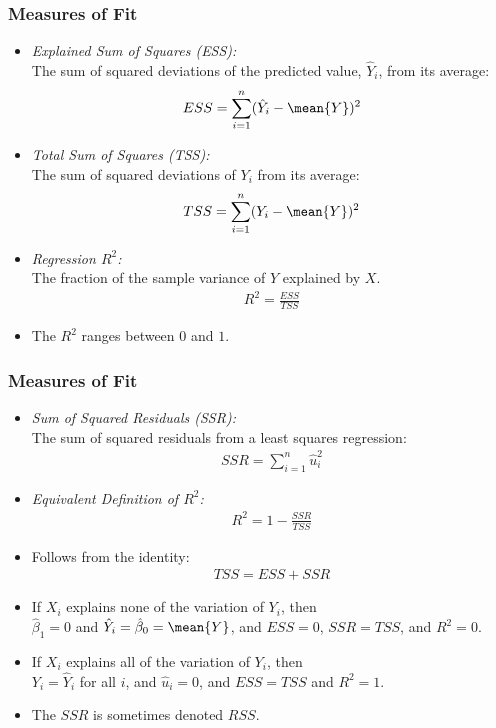 

\begin{frame}
\frametitle{Measures of Fit}
\begin{itemize}
\item \emph{Explained Sum of Squares (ESS):}\\
The sum of squared deviations of the predicted value, $\hat{Y}_i$, from its average: 
\begin{align*}
ESS = \sum_{i=1}^{n}(\hat{Y}_i-\mean{Y})^2
\end{align*}
\item \emph{Total Sum of Squares (TSS):}\\
The sum of squared deviations of $Y_i$ from its average:
\begin{align*}
TSS = \sum_{i=1}^{n}(Y_i-\mean{Y})^2
\end{align*}
\item \emph{Regression $R^{2}$:}\\ 
The fraction of the sample variance of $Y$ explained by $X$. 
\begin{align*}
R^{2} = \frac{ESS}{TSS}
\end{align*}
\item The $R^2$ ranges between $0$ and $1$. 
\end{itemize}
\end{frame}


\begin{frame}
\frametitle{Measures of Fit}
\begin{itemize}
\item \emph{Sum of Squared Residuals (SSR):}\\
The sum of squared residuals from a least squares regression: 
\begin{align*}
SSR = \sum_{i=1}^{n}\hat{u}_{i}^2
\end{align*}
\item \emph{Equivalent Definition of $R^{2}$:}
\begin{align*}
R^{2} = 1 - \frac{SSR}{TSS}
\end{align*}
\item Follows from the identity:
\begin{align*}
TSS = ESS + SSR
\end{align*}
\item If $X_i$ explains none of the variation of $Y_i$, then\\ 
$\hat{\beta}_{1}=0$ and $\hat{Y}_{i}=\hat{\beta}_{0}=\mean{Y}$, and $ESS=0$, $SSR=TSS$, and $R^{2}=0$.
\item If $X_{i}$ explains all of the variation of $Y_{i}$, then\\
$Y_{i}=\hat{Y}_{i}$ for all $i$, and $\hat{u}_{i}=0$, and $ESS=TSS$ and $R^{2}=1$. 
\item The $SSR$ is sometimes denoted $RSS$.
\end{itemize}
\end{frame}


